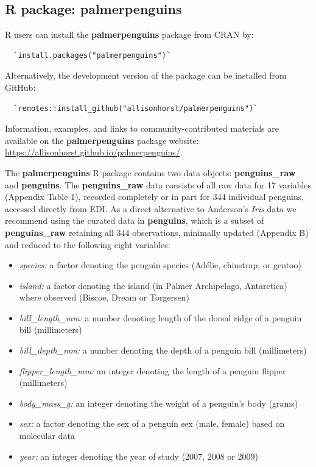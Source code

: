 \hypertarget{r-package-palmerpenguins}{%
\subsection{\texorpdfstring{R package: \textbf{palmerpenguins}}{R package: palmerpenguins}}\label{r-package-palmerpenguins}}

R users can install the \textbf{palmerpenguins} package from CRAN by:

\begin{verbatim}
  `install.packages("palmerpenguins")`
\end{verbatim}

Alternatively, the development version of the package can be installed from GitHub:

\begin{verbatim}
  `remotes::install_github("allisonhorst/palmerpenguins")`
\end{verbatim}

Information, examples, and links to community-contributed materials are available on the \textbf{palmerpenguins} package website: \url{https://allisonhorst.github.io/palmerpenguins/}.

The \textbf{palmerpenguins} R package contains two data objects: \textbf{penguins\_raw} and \textbf{penguins}. The \textbf{penguins\_raw} data consists of all raw data for 17 variables (Appendix Table 1), recorded completely or in part for 344 individual penguins, accessed directly from EDI. As a direct alternative to Anderson's \emph{Iris} data we recommend using the curated data in \textbf{penguins}, which is a subset of \textbf{penguins\_raw} retaining all 344 observations, minimally updated (Appendix B) and reduced to the following eight variables:

\begin{itemize}
\tightlist
\item
  \emph{species:} a factor denoting the penguin species (Adélie, chinstrap, or gentoo)
\item
  \emph{island:} a factor denoting the island (in Palmer Archipelago, Antarctica) where observed (Biscoe, Dream or Torgersen)
\item
  \emph{bill\_length\_mm:} a number denoting length of the dorsal ridge of a penguin bill (millimeters)
\item
  \emph{bill\_depth\_mm:} a number denoting the depth of a penguin bill (millimeters)
\item
  \emph{flipper\_length\_mm:} an integer denoting the length of a penguin flipper (millimeters)
\item
  \emph{body\_mass\_g:} an integer denoting the weight of a penguin's body (grams)
\item
  \emph{sex:} a factor denoting the sex of a penguin sex (male, female) based on molecular data
\item
  \emph{year:} an integer denoting the year of study (2007, 2008 or 2009)
\end{itemize}


